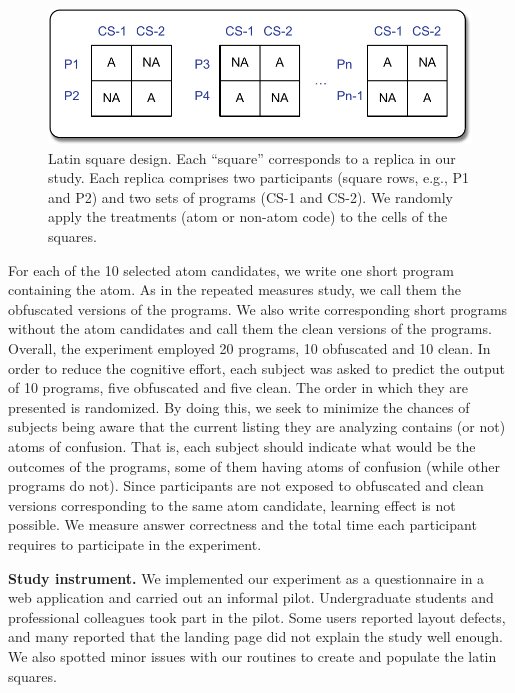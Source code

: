   \begin{figure}[htb!]
      \noindent
      \centering
      \includegraphics[scale=.50]{images/latin-square.pdf}
      \caption{Latin square design. Each ``square'' corresponds to 
      a replica in our study. Each replica comprises two participants (square rows, e.g., P1 and P2) 
      and two sets of programs (CS-1 and CS-2). We randomly apply the 
      treatments (atom or non-atom code) to the cells of the squares.} 
      \label{fig:latinsquare}
  \end{figure}

For each of the 10 selected atom candidates, we write one short program containing the atom. As in the repeated measures study, we call them the obfuscated versions of the programs. We also write corresponding short programs without the atom candidates and call them the clean versions of the programs. Overall, the experiment employed 20 programs, 10 obfuscated and 10 clean. In order to reduce the cognitive effort, each subject was asked to predict the output of 10 programs, five obfuscated and five clean. The order in which they are presented is randomized. By doing this, we seek to minimize the chances of subjects being aware that the current listing they are analyzing contains (or not) atoms of confusion. That is, each subject should indicate what would be the outcomes of the programs, some of them having atoms of confusion (while other programs do not). Since participants are not exposed to obfuscated and clean versions corresponding to the same atom candidate, learning effect is not possible. We measure answer correctness and the total time each participant requires to participate in the experiment.

{\bf Study instrument.} 
We implemented our experiment as a questionnaire in a web application and 
carried out an informal pilot.%
Undergraduate students and professional colleagues took part in the pilot. Some users reported layout defects, and many reported that the landing page did not explain the study well enough. We also spotted minor issues with our routines to create and populate the latin squares. 

